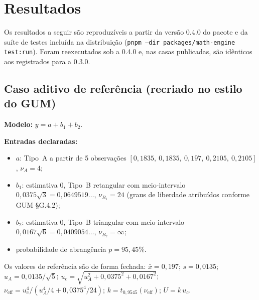 \documentclass[11pt,a4paper]{article}
\newcommand{\docVersion}{0.4.0}
\newcommand{\previousVersion}{0.3.0}
\begin{document}
\section{Resultados}
\label{sec:resultados}

Os resultados a seguir são reproduzíveis a partir da versão \docVersion{} do pacote e da suíte de testes incluída na distribuição (\texttt{pnpm --dir packages/math-engine test:run}). Foram reexecutados sob a \docVersion{} e, nas casas publicadas, são idênticos aos registrados para a \previousVersion{}.

\subsection{Caso aditivo de referência (recriado no estilo do GUM)}

\textbf{Modelo:} \(y = a + b_1 + b_2\).

\textbf{Entradas declaradas:}
\begin{itemize}
  \item \(a\): Tipo~A a partir de 5 observações \([0{,}1835,\ 0{,}1835,\ 0{,}197,\ 0{,}2105,\ 0{,}2105]\), \(\nu_A = 4\);
  \item \(b_1\): estimativa 0, Tipo~B retangular com meio-intervalo \(0{,}0375\sqrt{3} = 0{,}0649519\ldots\), \(\nu_{B_1} = 24\) (graus de liberdade atribuídos conforme GUM §G.4.2);
  \item \(b_2\): estimativa 0, Tipo~B triangular com meio-intervalo \(0{,}0167\sqrt{6} = 0{,}0409054\ldots\), \(\nu_{B_2} = \infty\);
  \item probabilidade de abrangência \(p = 95{,}45\%\).
\end{itemize}

Os valores de referência são de forma fechada: \(\bar{x} = 0{,}197\); \(s = 0{,}0135\); \(u_A = 0{,}0135/\sqrt{5}\); \(u_c = \sqrt{u_A^2 + 0{,}0375^2 + 0{,}0167^2}\); \(\nu_{\text{eff}} = u_c^4 / (u_A^4/4 + 0{,}0375^4/24)\); \(k = t_{0{,}9545}(\nu_{\text{eff}})\); \(U = k\,u_c\).
\end{document}

